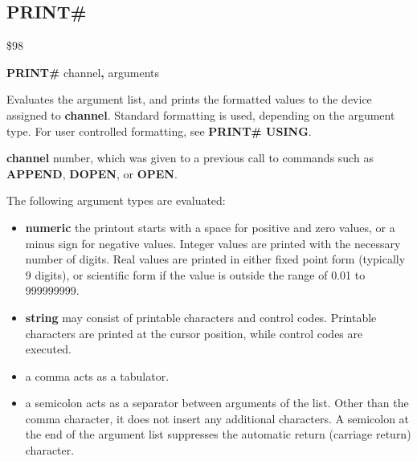 
\newpage
\subsection{PRINT\#}
\begin{description}[leftmargin=2cm,style=nextline]
\item [Token:] \$98
\item [Format:] {\bf PRINT\#} channel{\bf,} arguments
\item [Usage:]  Evaluates the argument list, and prints the formatted
                values to the device assigned to {\bf channel}.
                Standard formatting is used, depending on the
                argument type. For user controlled formatting,
                see {\bf PRINT\# USING}.

                {\bf channel} number, which was given to a previous
                call to commands such as {\bf APPEND}, {\bf DOPEN}, or {\bf OPEN}.

                The following argument types are evaluated:
                \begin{itemize}
                    \item {\bf numeric} the printout starts with a space
                    for positive and zero values, or a minus sign for
                    negative values. Integer values are printed with
                    the necessary number of digits. Real values are
                    printed in either fixed point form (typically
                    9 digits), or scientific form if the value is
                    outside the range of 0.01 to 999999999.

                    \item {\bf string} may consist of printable
                    characters and control codes. Printable characters
                    are printed at the cursor position, while control
                    codes are executed.

                    \item \screentext{,} a comma acts as a tabulator.

                    \item \screentext{;} a semicolon acts as a separator between
                    arguments of the list. Other than the comma character,
                    it does not insert any additional characters.
                    A semicolon at the end of the argument list suppresses
                    the automatic return (carriage return) character.
                \end{itemize}


\end{description}
